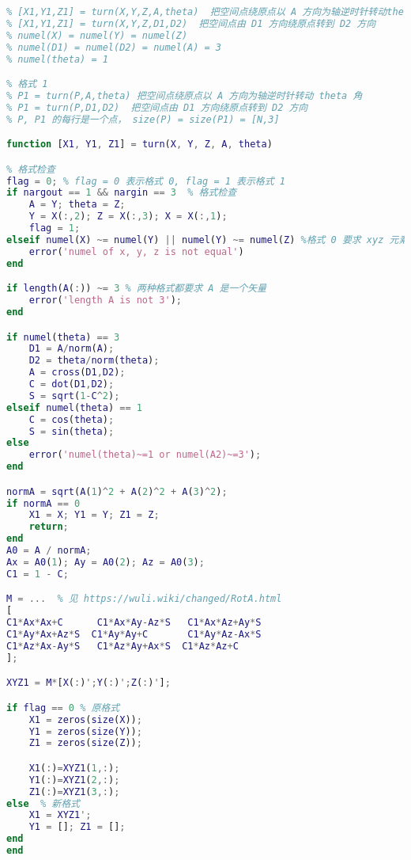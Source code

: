 \begin{lstlisting}[language=matlab, caption=turn.m]
% 格式 0
% [X1,Y1,Z1] = turn(X,Y,Z,A,theta)  把空间点绕原点以 A 方向为轴逆时针转动theta角
% [X1,Y1,Z1] = turn(X,Y,Z,D1,D2)  把空间点由 D1 方向绕原点转到 D2 方向
% numel(X) = numel(Y) = numel(Z)
% numel(D1) = numel(D2) = numel(A) = 3
% numel(theta) = 1

% 格式 1
% P1 = turn(P,A,theta) 把空间点绕原点以 A 方向为轴逆时针转动 theta 角
% P1 = turn(P,D1,D2)  把空间点由 D1 方向绕原点转到 D2 方向
% P, P1 的每行是一个点， size(P) = size(P1) = [N,3]

function [X1, Y1, Z1] = turn(X, Y, Z, A, theta)

% 格式检查
flag = 0; % flag = 0 表示格式 0, flag = 1 表示格式 1
if nargout == 1 && nargin == 3  % 格式检查
    A = Y; theta = Z;
    Y = X(:,2); Z = X(:,3); X = X(:,1);
    flag = 1;
elseif numel(X) ~= numel(Y) || numel(Y) ~= numel(Z) %格式 0 要求 xyz 元素个数相同即可
    error('numel of x, y, z is not equal')
end

if length(A(:)) ~= 3 % 两种格式都要求 A 是一个矢量
    error('length A is not 3');
end

if numel(theta) == 3
    D1 = A/norm(A);
    D2 = theta/norm(theta);
    A = cross(D1,D2);
    C = dot(D1,D2);
    S = sqrt(1-C^2);
elseif numel(theta) == 1
    C = cos(theta);
    S = sin(theta);
else
    error('numel(theta)~=1 or numel(A2)~=3'); 
end

normA = sqrt(A(1)^2 + A(2)^2 + A(3)^2);
if normA == 0
    X1 = X; Y1 = Y; Z1 = Z;
    return;
end
A0 = A / normA;
Ax = A0(1); Ay = A0(2); Az = A0(3);
C1 = 1 - C;

M = ...  % 见 https://wuli.wiki/changed/RotA.html
[
C1*Ax*Ax+C      C1*Ax*Ay-Az*S   C1*Ax*Az+Ay*S
C1*Ay*Ax+Az*S  C1*Ay*Ay+C       C1*Ay*Az-Ax*S
C1*Az*Ax-Ay*S   C1*Az*Ay+Ax*S  C1*Az*Az+C 
];

XYZ1 = M*[X(:)';Y(:)';Z(:)'];

if flag == 0 % 原格式
    X1 = zeros(size(X));
    Y1 = zeros(size(Y));
    Z1 = zeros(size(Z));

    X1(:)=XYZ1(1,:);
    Y1(:)=XYZ1(2,:);
    Z1(:)=XYZ1(3,:);
else  % 新格式
    X1 = XYZ1';
    Y1 = []; Z1 = [];
end
end
\end{lstlisting}
